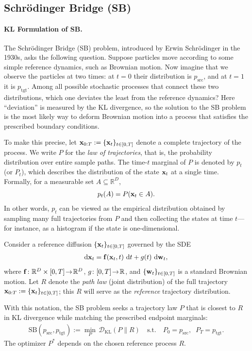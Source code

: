 \subsection{Schrödinger Bridge (SB)}\label{subsec:sb}


\paragraph{KL Formulation of SB.}
The Schrödinger Bridge (SB) problem, introduced by Erwin Schrödinger in the 1930s,
asks the following question. Suppose particles move according to some simple
reference dynamics, such as Brownian motion. Now imagine that we observe the
particles at two times: at $t=0$ their distribution is $p_{\mathrm{src}}$, and
at $t=1$ it is $p_{\mathrm{tgt}}$. Among all possible stochastic processes
that connect these two distributions, which one deviates the least from the
reference dynamics? Here ``deviation'' is measured by the KL divergence, so the
solution to the SB problem is the most likely way to deform Brownian motion
into a process that satisfies the prescribed boundary conditions.

To make this precise, let ${\mathbf{x}}_{0:T}:=\{{\mathbf{x}}_t\}_{t\in[0,T]}$ denote a complete
trajectory of the process. We write $P$ for the \emph{law of trajectories},
that is, the probability distribution over entire sample paths. The time-$t$
marginal of $P$ is denoted by $p_t$ (or $P_t$), which describes the
distribution of the state ${\mathbf{x}}_t$ at a single time. Formally, for a measurable
set $A\subseteq\mathbb R^D$,
\[
p_t(A) = P({\mathbf{x}}_t \in A).
\]
In other words, $p_t$ can be viewed as the empirical distribution obtained by
sampling many full trajectories from $P$ and then collecting the states at
time $t$—for instance, as a histogram if the state is one-dimensional.


Consider a reference diffusion $\{{\mathbf{x}}_t\}_{t\in[0,T]}$ governed by the SDE
\begin{align}\label{eq:general-sb-sde}
    \mathop{}\!\mathrm{d} {\mathbf{x}}_t  =  {\mathbf{f}}({\mathbf{x}}_t,t)\,\mathop{}\!\mathrm{d} t  +  g(t)\,\mathop{}\!\mathrm{d} {\mathbf{w}}_t,
\end{align}
where ${\mathbf{f}}\colon \mathbb{R}^D\times[0,T]\!\to\!\mathbb{R}^D$, $g\colon[0,T]\!\to\!\mathbb{R}$, and
$\{{\mathbf{w}}_t\}_{t\in[0,T]}$ is a standard Brownian motion.  
Let $R$ denote the \emph{path law} (joint distribution) of the full trajectory
${\mathbf{x}}_{0:T}:=\{{\mathbf{x}}_t\}_{t\in[0,T]}$; this $R$ will serve as the \emph{reference}
trajectory distribution.

With this notation, the SB problem seeks a trajectory law $P$
that is closest to $R$ in KL divergence while matching the prescribed endpoint
marginals:
\begin{align}\label{eq:sb-epsilon-general}
    \mathrm{SB}(p_{\mathrm{src}}, p_{\mathrm{tgt}})
    := \min_{P}\, \mathcal{D}_{\mathrm{KL}}(P\|R)
    \quad \text{s.t.} \quad P_0 = p_{\mathrm{src}},\;\; P_T = p_{\mathrm{tgt}}.
\end{align}
The optimizer $P^*$ depends on the chosen reference process $R$.

